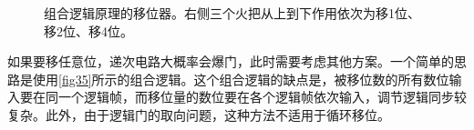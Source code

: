 \begin{figure}
\caption{组合逻辑原理的移位器。右侧三个火把从上到下作用依次为移1位、移2位、移4位。}\label{fig35}
\end{figure}

如果要移任意位，递次电路大概率会爆门，此时需要考虑其他方案。一个简单的思路是使用\autoref{fig35}所示的组合逻辑。这个组合逻辑的缺点是，被移位数的所有数位输入要在同一个逻辑帧，而移位量的数位要在各个逻辑帧依次输入，调节逻辑同步较复杂。此外，由于逻辑门的取向问题，这种方法不适用于循环移位。

